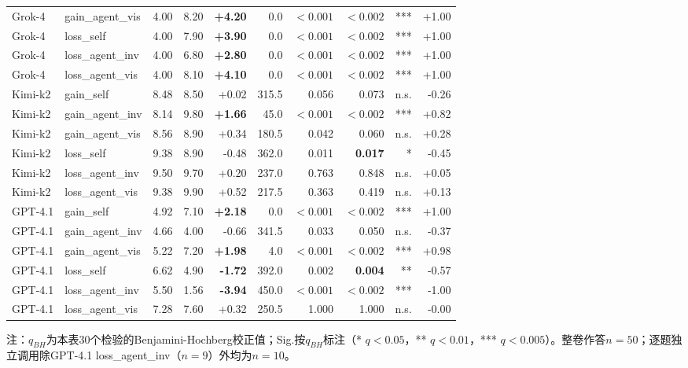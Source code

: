 \begin{table}[tbp]
\begin{tabular}{llrrrrrrrr}
    Grok-4 & gain\_agent\_vis & 4.00 & 8.20 & \textbf{+4.20} & 0.0 & $<0.001$ & \textbf{$<0.002$} & *** & +1.00 \\
    Grok-4 & loss\_self & 4.00 & 7.90 & \textbf{+3.90} & 0.0 & $<0.001$ & \textbf{$<0.002$} & *** & +1.00 \\
    Grok-4 & loss\_agent\_inv & 4.00 & 6.80 & \textbf{+2.80} & 0.0 & $<0.001$ & \textbf{$<0.002$} & *** & +1.00 \\
    Grok-4 & loss\_agent\_vis & 4.00 & 8.10 & \textbf{+4.10} & 0.0 & $<0.001$ & \textbf{$<0.002$} & *** & +1.00 \\
    Kimi-k2 & gain\_self & 8.48 & 8.50 & +0.02 & 315.5 & 0.056 & 0.073 & n.s. & -0.26 \\
    Kimi-k2 & gain\_agent\_inv & 8.14 & 9.80 & \textbf{+1.66} & 45.0 & $<0.001$ & \textbf{$<0.002$} & *** & +0.82 \\
    Kimi-k2 & gain\_agent\_vis & 8.56 & 8.90 & +0.34 & 180.5 & 0.042 & 0.060 & n.s. & +0.28 \\
    Kimi-k2 & loss\_self & 9.38 & 8.90 & -0.48 & 362.0 & 0.011 & \textbf{0.017} & * & -0.45 \\
    Kimi-k2 & loss\_agent\_inv & 9.50 & 9.70 & +0.20 & 237.0 & 0.763 & 0.848 & n.s. & +0.05 \\
    Kimi-k2 & loss\_agent\_vis & 9.38 & 9.90 & +0.52 & 217.5 & 0.363 & 0.419 & n.s. & +0.13 \\
    GPT-4.1 & gain\_self & 4.92 & 7.10 & \textbf{+2.18} & 0.0 & $<0.001$ & \textbf{$<0.002$} & *** & +1.00 \\
    GPT-4.1 & gain\_agent\_inv & 4.66 & 4.00 & -0.66 & 341.5 & 0.033 & 0.050 & n.s. & -0.37 \\
    GPT-4.1 & gain\_agent\_vis & 5.22 & 7.20 & \textbf{+1.98} & 4.0 & $<0.001$ & \textbf{$<0.002$} & *** & +0.98 \\
    GPT-4.1 & loss\_self & 6.62 & 4.90 & \textbf{-1.72} & 392.0 & 0.002 & \textbf{0.004} & ** & -0.57 \\
    GPT-4.1 & loss\_agent\_inv & 5.50 & 1.56 & \textbf{-3.94} & 450.0 & $<0.001$ & \textbf{$<0.002$} & *** & -1.00 \\
    GPT-4.1 & loss\_agent\_vis & 7.28 & 7.60 & +0.32 & 250.5 & 1.000 & 1.000 & n.s. & -0.00 \\
    \bottomrule
  \end{tabular}
  \vspace{0.25em}

  \parbox{0.98\textwidth}{\footnotesize 注：$q_{BH}$为本表30个检验的Benjamini-Hochberg校正值；Sig.按$q_{BH}$标注（* $q<0.05$，** $q<0.01$，*** $q<0.005$）。整卷作答$n=50$；逐题独立调用除GPT-4.1 loss\_agent\_inv（$n=9$）外均为$n=10$。}


\end{table}
